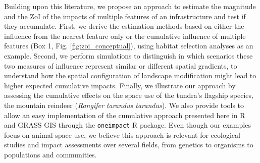 \documentclass[titlepage]{article}
\begin{document}
Building upon this literature, we propose an approach to estimate the magnitude and the ZoI of the impacts of multiple features of an infrastructure and test if they accumulate. First, we derive the estimation methods based on either the influence from the nearest feature only or the cumulative influence of multiple features (Box 1, Fig. \ref{fig:zoi_conceptual}), using habitat selection analyses as an example. Second, we perform simulations to distinguish in which scenarios these two measures of influence represent similar or different spatial gradients, to understand how the spatial configuration of landscape modification might lead to higher expected cumulative impacts. 
Finally, we illustrate our approach by assessing the cumulative effects on the space use of the tundra's flagship species, the mountain reindeer (\textit{Rangifer tarandus tarandus}). We also provide tools to allow an easy implementation of the cumulative approach presented here in R \citep{r_core_team_r_2020} and GRASS GIS \citep{grass_development_team_geographic_2017} through the \verb|oneimpact| R package. Even though our examples focus on animal space use, we believe this approach is relevant for ecological studies and impact assessments over several fields, from genetics to organisms to populations and communities.
\end{document}
